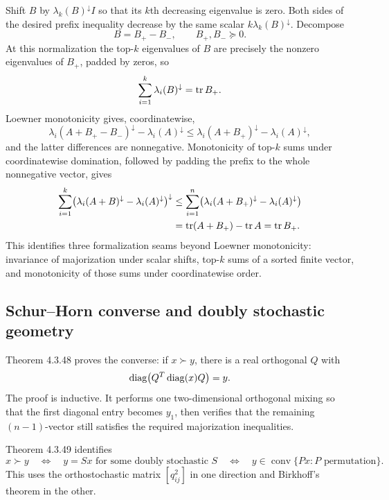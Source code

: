 Shift $B$ by $\lambda_k(B)^{\downarrow}I$ so that its $k$th decreasing eigenvalue is zero. Both sides of the desired prefix inequality decrease by the same scalar $k\lambda_k(B)^{\downarrow}$. Decompose
\[
  B=B_+-B_-,
  \qquad B_+,B_-\succeq0.
\]
At this normalization the top-$k$ eigenvalues of $B$ are precisely the nonzero eigenvalues of $B_+$, padded by zeros, so
\[
  \sum_{i=1}^k\lambda_i(B)^{\downarrow}=\operatorname{tr} B_+.
\]
Loewner monotonicity gives, coordinatewise,
\[
  \lambda_i(A+B_+-B_-)^{\downarrow}-\lambda_i(A)^{\downarrow}
  \le
  \lambda_i(A+B_+)^{\downarrow}-\lambda_i(A)^{\downarrow},
\]
and the latter differences are nonnegative. Monotonicity of top-$k$ sums under coordinatewise domination, followed by padding the prefix to the whole nonnegative vector, gives
\begin{align*}
 \sum_{i=1}^k
 \bigl(\lambda_i(A+B)^{\downarrow}-\lambda_i(A)^{\downarrow}\bigr)^{\downarrow}
 &\le \sum_{i=1}^n
 \bigl(\lambda_i(A+B_+)^{\downarrow}-\lambda_i(A)^{\downarrow}\bigr)\\
 &=\operatorname{tr}(A+B_+)-\operatorname{tr} A=\operatorname{tr} B_+.
\end{align*}
This identifies three formalization seams beyond Loewner monotonicity: invariance of majorization under scalar shifts, top-$k$ sums of a sorted finite vector, and monotonicity of those sums under coordinatewise order.


\subsection{Schur--Horn converse and doubly stochastic geometry}

Theorem 4.3.48 proves the converse: if $x\succ y$, there is a real orthogonal $Q$ with
\[
  \operatorname{diag}\bigl(Q^T\operatorname{diag}(x)Q\bigr)=y.
\]
The proof is inductive. It performs one two-dimensional orthogonal mixing so that the first diagonal entry becomes $y_1$, then verifies that the remaining $(n-1)$-vector still satisfies the required majorization inequalities.

Theorem 4.3.49 identifies
\[
  x\succ y
  \quad\Longleftrightarrow\quad
  y=Sx\text{ for some doubly stochastic }S
  \quad\Longleftrightarrow\quad
  y\in\operatorname{conv}\{Px:P\text{ permutation}\}.
\]
This uses the orthostochastic matrix $[q_{ij}^2]$ in one direction and Birkhoff's theorem in the other.

